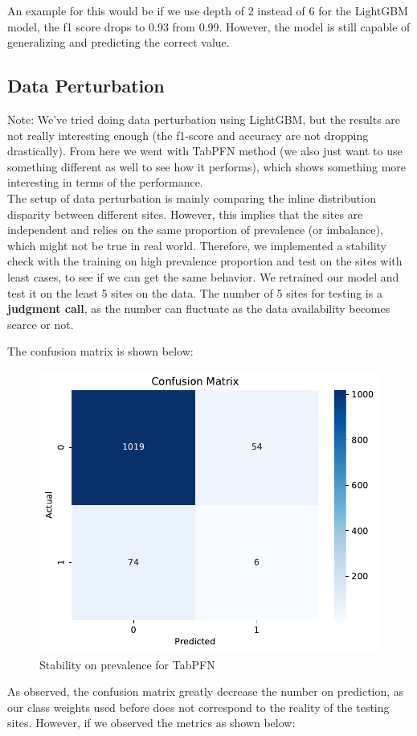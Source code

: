 \documentclass[10pt,letterpaper]{article}
\begin{document}
An example for this would be if we use depth of 2 instead of 6 for the LightGBM model, the f1 score drops to 0.93 from 0.99. However, the model is still capable of generalizing and predicting the correct value.


\subsection{Data Perturbation}
Note: We've tried doing data perturbation using LightGBM, but the results are not really interesting enough (the f1-score and accuracy are not dropping drastically). From here we went with TabPFN method (we also just want to use something different as well to see how it performs), which shows something more interesting in terms of the performance. \\

The setup of data perturbation is mainly comparing the inline distribution disparity between different sites. However, this implies that the sites are independent and relies on the same proportion of prevalence (or imbalance), which might not be true in real world. Therefore, we implemented a stability check with the training on high prevalence proportion and test on the sites with least cases, to see if we can get the same behavior. We retrained our model and test it on the least 5 sites on the data. The number of 5 sites for testing is a \textbf{judgment call}, as the number can fluctuate as the data availability becomes scarce or not.  

The confusion matrix is shown below:

\begin{figure}[H]
    \centering
    \includegraphics[width=0.5\linewidth]{plots/tabpfn_confusion_matrix_stab1.pdf}
    \caption{Stability on prevalence for TabPFN}
    \label{fig:stability1}
\end{figure}

As observed, the confusion matrix greatly decrease the number on prediction, as our class weights used before does not correspond to the reality of the testing sites. However, if we observed the metrics as shown below:
\end{document}

